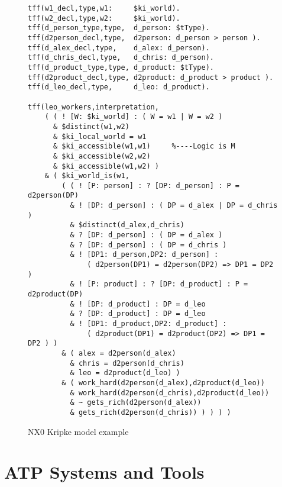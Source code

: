 \documentclass[runningheads]{llncs}
\begin{document}
\begin{figure}[h!]
\small
{}
% 
\begin{verbatim}
tff(w1_decl,type,w1:     $ki_world).
tff(w2_decl,type,w2:     $ki_world).
tff(d_person_type,type,  d_person: $tType).
tff(d2person_decl,type,  d2person: d_person > person ).
tff(d_alex_decl,type,    d_alex: d_person).
tff(d_chris_decl,type,   d_chris: d_person).
tff(d_product_type,type, d_product: $tType).
tff(d2product_decl,type, d2product: d_product > product ).
tff(d_leo_decl,type,     d_leo: d_product).

tff(leo_workers,interpretation,
    ( ( ! [W: $ki_world] : ( W = w1 | W = w2 )
      & $distinct(w1,w2)
      & $ki_local_world = w1
      & $ki_accessible(w1,w1)     %----Logic is M
      & $ki_accessible(w2,w2)
      & $ki_accessible(w1,w2) )
    & ( $ki_world_is(w1,
        ( ( ! [P: person] : ? [DP: d_person] : P = d2person(DP)
          & ! [DP: d_person] : ( DP = d_alex | DP = d_chris )
          & $distinct(d_alex,d_chris)
          & ? [DP: d_person] : ( DP = d_alex )
          & ? [DP: d_person] : ( DP = d_chris )
          & ! [DP1: d_person,DP2: d_person] : 
              ( d2person(DP1) = d2person(DP2) => DP1 = DP2 )
          & ! [P: product] : ? [DP: d_product] : P = d2product(DP)
          & ! [DP: d_product] : DP = d_leo
          & ? [DP: d_product] : DP = d_leo
          & ! [DP1: d_product,DP2: d_product] :
              ( d2product(DP1) = d2product(DP2) => DP1 = DP2 ) )
        & ( alex = d2person(d_alex)
          & chris = d2person(d_chris)
          & leo = d2product(d_leo) )
        & ( work_hard(d2person(d_alex),d2product(d_leo))
          & work_hard(d2person(d_chris),d2product(d_leo))
          & ~ gets_rich(d2person(d_alex))
          & gets_rich(d2person(d_chris)) ) ) ) )
\end{verbatim}
\caption{NX0 Kripke model example}
\label{NX0Kripke}
\end{figure}

\section{ATP Systems and Tools}
\label{SystemsTools}
\end{document}
